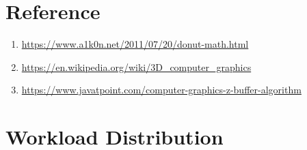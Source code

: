 \documentclass{article}
\begin{document}
\section{Reference}

\begin{enumerate}
  \item \url{https://www.a1k0n.net/2011/07/20/donut-math.html}
  \item \url{https://en.wikipedia.org/wiki/3D_computer_graphics}
  \item \url{https://www.javatpoint.com/computer-graphics-z-buffer-algorithm}
\end{enumerate}

\section{Workload Distribution}
\end{document}

